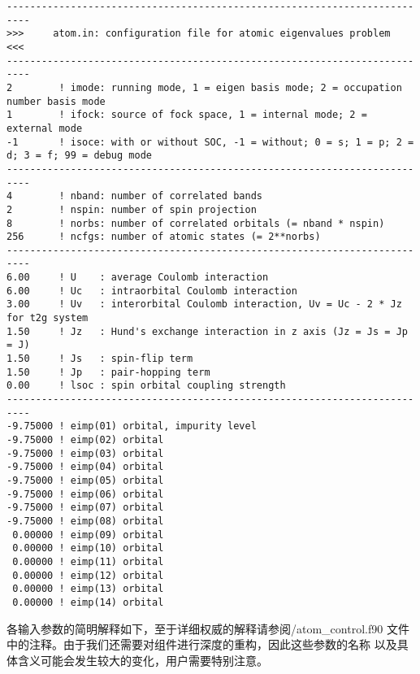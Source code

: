 \begin{lstlisting}[frame=single]
--------------------------------------------------------------------------
>>>     atom.in: configuration file for atomic eigenvalues problem     <<<
--------------------------------------------------------------------------
2        ! imode: running mode, 1 = eigen basis mode; 2 = occupation number basis mode
1        ! ifock: source of fock space, 1 = internal mode; 2 = external mode
-1       ! isoce: with or without SOC, -1 = without; 0 = s; 1 = p; 2 = d; 3 = f; 99 = debug mode
--------------------------------------------------------------------------
4        ! nband: number of correlated bands
2        ! nspin: number of spin projection
8        ! norbs: number of correlated orbitals (= nband * nspin)
256      ! ncfgs: number of atomic states (= 2**norbs)
--------------------------------------------------------------------------
6.00     ! U    : average Coulomb interaction
6.00     ! Uc   : intraorbital Coulomb interaction
3.00     ! Uv   : interorbital Coulomb interaction, Uv = Uc - 2 * Jz for t2g system
1.50     ! Jz   : Hund's exchange interaction in z axis (Jz = Js = Jp = J)
1.50     ! Js   : spin-flip term
1.50     ! Jp   : pair-hopping term
0.00     ! lsoc : spin orbital coupling strength
--------------------------------------------------------------------------
-9.75000 ! eimp(01) orbital, impurity level
-9.75000 ! eimp(02) orbital
-9.75000 ! eimp(03) orbital
-9.75000 ! eimp(04) orbital
-9.75000 ! eimp(05) orbital
-9.75000 ! eimp(06) orbital
-9.75000 ! eimp(07) orbital
-9.75000 ! eimp(08) orbital
 0.00000 ! eimp(09) orbital
 0.00000 ! eimp(10) orbital
 0.00000 ! eimp(11) orbital
 0.00000 ! eimp(12) orbital
 0.00000 ! eimp(13) orbital
 0.00000 ! eimp(14) orbital
\end{lstlisting}

各输入参数的简明解释如下，至于详细权威的解释请参阅{\jasmine}/atom\_control.f90
文件中的注释。由于我们还需要对{\jasmine}组件进行深度的重构，因此这些参数的名称
以及具体含义可能会发生较大的变化，用户需要特别注意。


